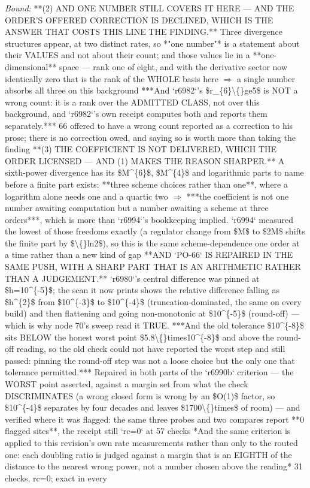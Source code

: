 \begin{description}
 \emph{Bound:}  **(2) AND ONE NUMBER STILL COVERS IT HERE --- AND THE ORDER'S OFFERED CORRECTION IS DECLINED, WHICH IS THE ANSWER THAT COSTS THIS LINE THE FINDING.** Three divergence structures appear, at two distinct rates, so *"one number"* is a statement about their VALUES and not about their count; and those values lie in a **one-dimensional** space --- rank one of eight, and with the derivative sector now identically zero that is the rank of the WHOLE basis here \ensuremath{\Rightarrow} a single number absorbs all three on this background  ***And `r6982`'s \$r\_\{6\}\textbackslash\{\}ge5\$ is NOT a wrong count: it is a rank over the ADMITTED CLASS, not over this background, and `r6982`'s own receipt computes both and reports them separately.*** 66 offered to have a wrong count reported as a correction to his prose; there is no correction owed, and saying so is worth more than taking the finding   **(3) THE COEFFICIENT IS NOT DELIVERED, WHICH THE ORDER LICENSED --- AND (1) MAKES THE REASON SHARPER.** A sixth-power divergence has its \$M\textasciicircum{}\{6\}\$, \$M\textasciicircum{}\{4\}\$ and logarithmic parts to name before a finite part exists: **three scheme choices rather than one**, where a logarithm alone needs one and a quartic two \ensuremath{\Rightarrow} ***the coefficient is not one number awaiting computation but a number awaiting a scheme at three orders***, which is more than `r6994`'s bookkeeping implied. `r6994` measured the lowest of those freedoms exactly (a regulator change from \$M\$ to \$2M\$ shifts the finite part by \$\textbackslash\{\}ln2\$), so this is the same scheme-dependence one order at a time rather than a new kind of gap   **AND `PO-66` IS REPAIRED IN THE SAME PUSH, WITH A SHARP PART THAT IS AN ARITHMETIC RATHER THAN A JUDGEMENT.** `r6980`'s central difference was pinned at \$h=10\textasciicircum{}\{-5\}\$; the scan it now prints shows the relative difference falling as \$h\textasciicircum{}\{2\}\$ from \$10\textasciicircum{}\{-3\}\$ to \$10\textasciicircum{}\{-4\}\$ (truncation-dominated, the same on every build) and then flattening and going non-monotonic at \$10\textasciicircum{}\{-5\}\$ (round-off) --- which is why node 70's sweep read it TRUE. ***And the old tolerance \$10\textasciicircum{}\{-8\}\$ sits BELOW the honest worst point \$5.8\textbackslash\{\}times10\textasciicircum{}\{-8\}\$ and above the round-off reading, so the old check could not have reported the worst step and still passed: pinning the round-off step was not a loose choice but the only one that tolerance permitted.*** Repaired in both parts of the `r6990b` criterion --- the WORST point asserted, against a margin set from what the check DISCRIMINATES (a wrong closed form is wrong by an \$O(1)\$ factor, so \$10\textasciicircum{}\{-4\}\$ separates by four decades and leaves \$1700\textbackslash\{\}times\$ of room) --- and verified where it was flagged: the same three probes and two compares report **0 flagged sites**, the receipt still `rc=0` at 57 checks   *And the same criterion is applied to this revision's own rate measurements rather than only to the routed one: each doubling ratio is judged against a margin that is an EIGHTH of the distance to the nearest wrong power, not a number chosen above the reading*  31 checks, rc=0; exact in every 
\end{description}
